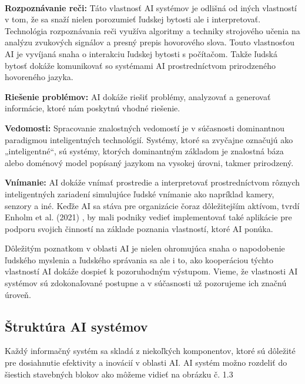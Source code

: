  \\
\par \textbf{Rozpoznávanie reči:} Táto vlastnosť AI systémov je odlišná od iných vlastností v tom, že sa snaží nielen porozumieť ľudskej bytosti ale i interpretovať. Technológia rozpoznávania reči využíva algoritmy a techniky strojového učenia na analýzu zvukových signálov a presný prepis hovorového slova. Touto vlastnosťou AI je vyvíjaná snaha o interakciu ľudskej bytosti s počítačom. Takže ľudská bytosť dokáže komunikovať so systémami AI prostredníctvom prirodzeného hovoreného jazyka.
 \\
\par \textbf{Riešenie problémov:} AI dokáže riešiť problémy, analyzovať a generovať informácie, ktoré nám poskytnú vhodné riešenie.
 \\
\par \textbf{Vedomosti:} Spracovanie znalostných vedomostí je v súčasnosti dominantnou paradigmou inteligentných technológií. Systémy, ktoré sa zvyčajne označujú ako „inteligentné“, sú systémy, ktorých dominantným základom je znalostná báza alebo doménový model popísaný jazykom na vysokej úrovni, takmer prirodzený. \cite{kornienko2015}
 \\
\par \textbf{Vnímanie:} AI dokáže vnímať prostredie a interpretovať prostredníctvom rôznych inteligentných zariadení simulujúce ľudské vnímanie ako napríklad kamery, senzory a iné. 
Keďže AI sa stáva pre organizácie čoraz dôležitejším aktívom, tvrdí Enholm et al. (2021) \cite{enholm2022}, by mali podniky vedieť implementovať také aplikácie pre podporu svojich činností na základe poznania vlastností, ktoré AI ponúka.  \cite{article} 

\par Dôležitým poznatkom v oblasti AI je nielen ohromujúca snaha o napodobenie ľudského myslenia a ľudského správania sa ale i to, ako kooperáciou týchto vlastností AI dokáže dospieť k pozoruhodným výstupom. Vieme, že vlastnosti AI systémov sú zdokonaľované postupne a v súčasnosti už pozorujeme ich značnú úroveň.




\subsection{Štruktúra AI systémov}

Každý informačný systém sa skladá z niekoľkých komponentov, ktoré sú dôležité pre dosiahnutie efektivity a inovácií v oblasti AI. AI systém možno rozdeliť do šiestich stavebných blokov ako môžeme vidieť na obrázku č. 1.3


